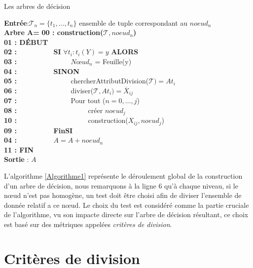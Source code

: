 \documentclass[a4paper, 11pt]{report}
\newcommand{\set}[1]{\ensuremath{\overline{#1}}}
\newcommand{\tupleset}{\ensuremath{\mathcal{T}}}
\begin{document}
\begin{chapter}{Les arbres de décision}
\begin{algorithm}[!h]
\renewcommand\thealgorithm{}
\caption{\textbf{1 } : Algorithme de création d'un arbre de décision}
\begin{algorithmic}
\STATE \textbf{Entrée}:$\tupleset_n=\{t_1,\dots,t_n\}$ ensemble de tuple correspondant au $noeud_n$\\
\textbf{Arbre A={}}
\textbf{00 : construction($\tupleset,noeud_n$)}\\
\textbf{01 : DÉBUT}\\
\textbf{02 : }\ \ \ \ \ \ \ \ \ \ \textbf{SI} $\forall{t_i} : t_i(Y) = y$ \textbf{ALORS}\\
\textbf{03 : }\ \ \ \ \ \ \ \ \ \ \ \ \ \ \ $Nœud_n$ = Feuille(y)\\
\textbf{04 : }\ \ \ \ \ \ \ \ \ \ \textbf{SINON}\\
\textbf{05 : }\ \ \ \ \ \ \ \ \ \ \ \ \ \ \ chercherAttributDivision($\tupleset)=At_i$\\
\textbf{06 : }\ \ \ \ \ \ \ \ \ \ \ \ \ \ \ diviser($\tupleset,At_i)=\set X_{ij}$\\
\textbf{07 : }\ \ \ \ \ \ \ \ \ \ \ \ \ \ \ Pour tout ($n=0,\dots,j$) \\
\textbf{08 : }\ \ \ \ \ \ \ \ \ \ \ \ \ \ \ \ \ \ \ \ créer $noeud_j$\\
\textbf{10 : }\ \ \ \ \ \ \ \ \ \ \ \ \ \ \ \ \ \ \ \ construction($X_{ij},noeud_j$)\\
\textbf{09 : }\ \ \ \ \ \ \ \ \ \ \textbf{FinSI}\\
\textbf{04 : }\ \ \ \ \ \ \ \ \ \ \textbf{$A=A+noeud_n$}\\
\textbf{11 : FIN}\\
\textbf{Sortie} : $A$

\label{Algorithme1}
\end{algorithmic}
\addtocounter{algorithm}{-1}
\end{algorithm}


L'algorithme \ref{Algorithme1} représente le déroulement global de la construction d'un arbre de décision, nous remarquons à la ligne 6 qu'à chaque niveau, si le nœud n'est pas homogène, un test doit être choisi afin de diviser l'ensemble de donnée relatif a ce nœud. Le choix du test est considéré comme la partie cruciale de l'algorithme, vu son impacte directe sur l'arbre de décision résultant, ce choix est basé sur des métriques appelées \emph{critères de division}.\\ 

\section{Critères de division}



\end{chapter}
\end{document}
